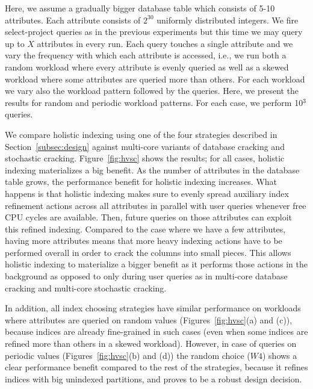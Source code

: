 Here, we assume a gradually bigger database table which consists of 5-10 attributes.
Each attribute consists of $2^{30}$ uniformly distributed integers.
We fire select-project queries as in the previous experiments but this time we may query up to $X$
attributes in every run. 
Each query touches a single attribute and we vary the frequency with which each attribute is accessed, i.e.,
we run both a random workload where every attribute is evenly queried as well as a skewed workload
where some attributes are queried more than others.
For each workload we vary also the workload pattern followed by the queries.
Here, we present the results for random and periodic workload patterns.
For each case, we perform 10$^{3}$ queries.

We compare holistic indexing using one of the four strategies described in Section~\ref{subsec:design} against multi-core variants of database cracking and stochastic cracking.
Figure~\ref{fig:hvsc} shows the results;
for all cases, holistic indexing materializes a big benefit.
As the number of attributes in the database table grows, the performance benefit for holistic indexing increases. 
What happens is that holistic indexing makes sure to evenly spread
auxiliary index refinement actions across all attributes in parallel with user queries whenever free CPU
cycles are available. Then, future queries on those attributes can exploit this refined indexing. 
Compared to the case where we have a few attributes, having more attributes means that
more heavy indexing actions have to be performed overall in order to crack the columns into small pieces.
This allows holistic indexing to materialize a bigger benefit as it performs those actions in the background as opposed to 
only during user queries as in multi-core database cracking and multi-core stochastic cracking.

In addition, all index choosing strategies have similar performance on workloads where attributes are queried on random values (Figures~\ref{fig:hvsc}(a) and (c)), 
because indices are already fine-grained in such cases (even when some indices are refined more than others in a skewed workload).
However, in case of queries on periodic values (Figures~\ref{fig:hvsc}(b) and (d)) the random choice ($W4$) shows a clear performance benefit compared to the rest of the strategies, 
because it refines indices with big unindexed partitions,
and proves to be a robust design decision.


